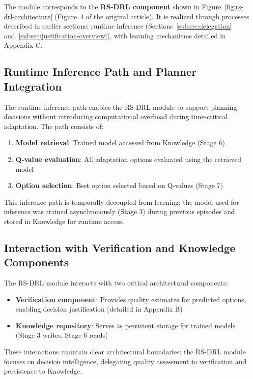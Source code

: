 \documentclass[11pt,a4paper]{article}
\begin{document}
The module corresponds to the \textbf{RS-DRL component} shown in Figure~\ref{fig:rs-drl-architecture} (Figure~4 of the original article). It is realized through processes described in earlier sections: runtime inference (Sections~\ref{subsec:delegation} and~\ref{subsec:justification-overview}), with learning mechanisms detailed in Appendix C.

\subsection{Runtime Inference Path and Planner Integration}
\label{subsec:inference-path}

The runtime inference path enables the RS-DRL module to support planning decisions without introducing computational overhead during time-critical adaptation. The path consists of:

\begin{enumerate}
    \item \textbf{Model retrieval}: Trained model accessed from Knowledge (Stage 6)
    \item \textbf{Q-value evaluation}: All adaptation options evaluated using the retrieved model
    \item \textbf{Option selection}: Best option selected based on Q-values (Stage 7)
\end{enumerate}

This inference path is temporally decoupled from learning: the model used for inference was trained asynchronously (Stage 3) during previous episodes and stored in Knowledge for runtime access.

\subsection{Interaction with Verification and Knowledge Components}
\label{subsec:rs-drl-interaction}

The RS-DRL module interacts with two critical architectural components:

\begin{itemize}
    \item \textbf{Verification component}: Provides quality estimates for predicted options, enabling decision justification (detailed in Appendix B)
    \item \textbf{Knowledge repository}: Serves as persistent storage for trained models (Stage 3 writes, Stage 6 reads)
\end{itemize}

These interactions maintain clear architectural boundaries: the RS-DRL module focuses on decision intelligence, delegating quality assessment to verification and persistence to Knowledge.
\end{document}

